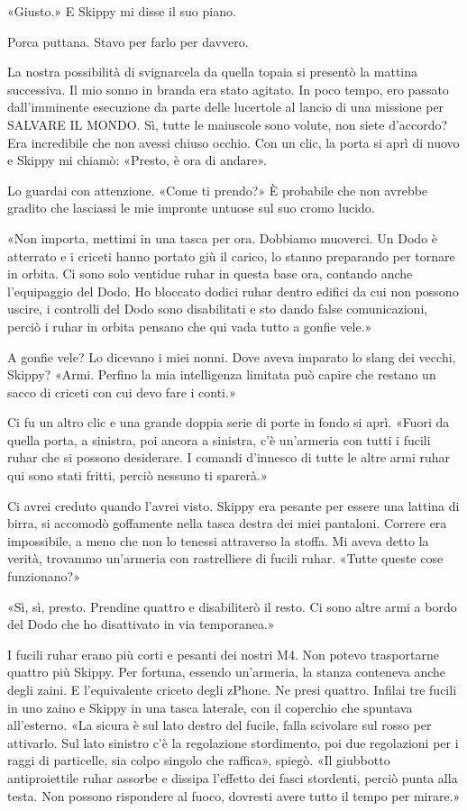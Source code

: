 «Giusto.» E Skippy mi disse il suo piano.

Porca puttana. Stavo per farlo per davvero.

\hfill\break

La nostra possibilità di svignarcela da quella topaia si presentò la
mattina successiva. Il mio sonno in branda era stato agitato. In poco
tempo, ero passato dall'imminente esecuzione da parte delle lucertole al
lancio di una missione per SALVARE IL MONDO. Sì, tutte le maiuscole sono
volute, non siete d'accordo? Era incredibile che non avessi chiuso
occhio. Con un clic, la porta si aprì di nuovo e Skippy mi chiamò:
«Presto, è ora di andare».

Lo guardai con attenzione. «Come ti prendo?» È probabile che non avrebbe
gradito che lasciassi le mie impronte untuose sul suo cromo lucido.

«Non importa, mettimi in una tasca per ora. Dobbiamo muoverci. Un Dodo è
atterrato e i criceti hanno portato giù il carico, lo stanno preparando
per tornare in orbita. Ci sono solo ventidue ruhar in questa base ora,
contando anche l'equipaggio del Dodo. Ho bloccato dodici ruhar dentro
edifici da cui non possono uscire, i controlli del Dodo sono
disabilitati e sto dando false comunicazioni, perciò i ruhar in orbita
pensano che qui vada tutto a gonfie vele.»

A gonfie vele? Lo dicevano i miei nonni. Dove aveva imparato lo slang
dei vecchi, Skippy? «Armi. Perfino la mia intelligenza limitata può
capire che restano un sacco di criceti con cui devo fare i conti.»

Ci fu un altro clic e una grande doppia serie di porte in fondo si aprì.
«Fuori da quella porta, a sinistra, poi ancora a sinistra, c'è
un'armeria con tutti i fucili ruhar che si possono desiderare. I comandi
d'innesco di tutte le altre armi ruhar qui sono stati fritti, perciò
nessuno ti sparerà.»

Ci avrei creduto quando l'avrei visto. Skippy era pesante per essere una
lattina di birra, si accomodò goffamente nella tasca destra dei miei
pantaloni. Correre era impossibile, a meno che non lo tenessi attraverso
la stoffa. Mi aveva detto la verità, trovammo un'armeria con
rastrelliere di fucili ruhar. «Tutte queste cose funzionano?»

«Sì, sì, presto. Prendine quattro e disabiliterò il resto. Ci sono altre
armi a bordo del Dodo che ho disattivato in via temporanea.»

I fucili ruhar erano più corti e pesanti dei nostri M4. Non potevo
trasportarne quattro più Skippy. Per fortuna, essendo un'armeria, la
stanza conteneva anche degli zaini. E l'equivalente criceto degli
zPhone. Ne presi quattro. Infilai tre fucili in uno zaino e Skippy in
una tasca laterale, con il coperchio che spuntava all'esterno. «La
sicura è sul lato destro del fucile, falla scivolare sul rosso per
attivarlo. Sul lato sinistro c'è la regolazione stordimento, poi due
regolazioni per i raggi di particelle, sia colpo singolo che raffica»,
spiegò. «Il giubbotto antiproiettile ruhar assorbe e dissipa l'effetto
dei fasci stordenti, perciò punta alla testa. Non possono rispondere al
fuoco, dovresti avere tutto il tempo per mirare.»

